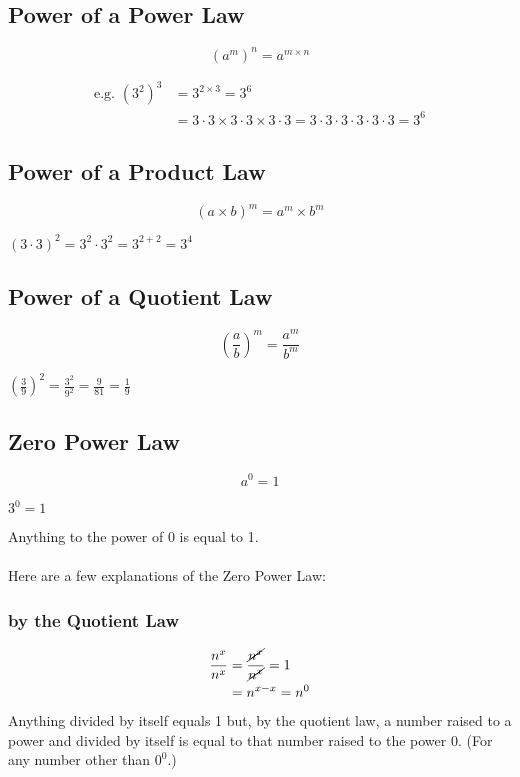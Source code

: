 \documentclass{article}
\begin{document}
\subsection{Power of a Power Law}
\begin{Large}
$$(a^m)^n=a^{m \times n}$$
\end{Large}
\begin{align*}
\text{e.g. }(3^2)^3&=3^{2 \times 3}=3^6\\
&=3 \cdot 3 \times 3 \cdot 3 \times 3\cdot 3=3 \cdot 3 \cdot 3 \cdot 3 \cdot 3 \cdot 3=3^6
\end{align*}

\subsection{Power of a Product Law}
\begin{Large}
$$(a \times b)^m=a^m \times b^m$$
\end{Large}
\begin{center}
$(3 \cdot 3)^2=3^2 \cdot 3^2=3^{2+2}=3^4$
\end{center}

\subsection{Power of a Quotient Law}
\begin{Large}
$$\left(\frac{a}{b}\right)^m=\frac{a^m}{b^m}$$
\end{Large}
\begin{center}
$\left(\frac{3}{9}\right)^2=\frac{3^2}{9^2}=\frac{9}{81}=\frac{1}{9}$
\end{center}

\newpage

\subsection{Zero Power Law}
\begin{Large}
$$a^0=1$$
\end{Large}
\begin{center}
$3^0=1$
\end{center}
Anything to the power of 0 is equal to 1.\\
\\
Here are a few explanations of the Zero Power Law:
\subsubsection{by the Quotient Law}
\begin{align*}
\frac{n^x}{n^x}&=\frac{\cancel{n^x}}{\cancel{n^x}}  =1\\
&=n^{x-x}=n^0
\end{align*}
Anything divided by itself equals 1 but, by the quotient law, a number raised to a power and divided by itself is equal to that number raised to the power 0. (For any number other than $0^0$.)
\end{document}
